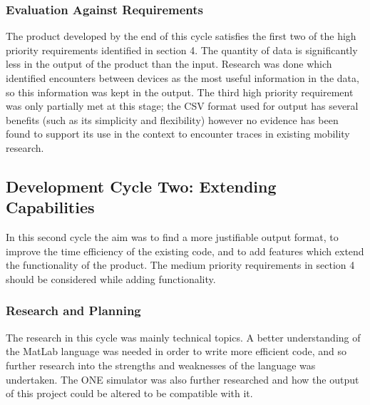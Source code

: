     \subsubsection{Evaluation Against Requirements}
    The product developed by the end of this cycle satisfies the first two of the high priority requirements identified in section 4. The quantity of data is significantly less in the output of the product than the input. Research was done which identified encounters between devices as the most useful information in the data, so this information was kept in the output. The third high priority requirement was only partially met at this stage; the CSV format used for output has several benefits (such as its simplicity and flexibility) however no evidence has been found to support its use in the context to encounter traces in existing mobility research.   
\subsection{Development Cycle Two: Extending Capabilities}
In this second cycle the aim was to find a more justifiable output format, to improve the time efficiency of the existing code, and to add features which extend the functionality of the product. The medium priority requirements in section 4 should be considered while adding functionality.
    \subsubsection{Research and Planning}
    The research in this cycle was mainly technical topics. A better understanding of the MatLab language was needed in order to write more efficient code, and so further research into the strengths and weaknesses of the language was undertaken. The ONE simulator was also further researched and how the output of this project could be altered to be compatible with it.
